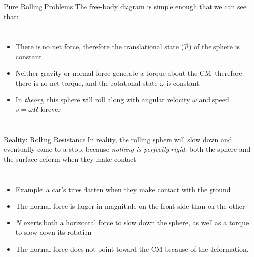 \documentclass[12pt,compress,aspectratio=169]{beamer}
\begin{document}
\begin{frame}{Pure Rolling Problems}
  The free-body diagram is simple enough that we can see that:
  \begin{columns}
    \begin{itemize}
    \item There is no net force, therefore the translational state ($\vec v$)
      of the sphere is constant

    \item Neither gravity or normal force generate a torque about the CM,
      therefore there is no net torque, and the rotational state $\omega$ is
      constant:

    \item In \emph{theory}, this sphere will roll along with angular velocity
      $\omega$ and speed $v=\omega R$ forever
    \end{itemize}

  \end{columns}
\end{frame}



\begin{frame}{Reality: Rolling Resistance}
  In reality, the rolling sphere will slow down and eventually come to a stop,
  because \emph{nothing is perfectly rigid}: both the sphere and the surface
  deform when they make contact
  \begin{columns}
    \begin{itemize}
    \item Example: a car's tires flatten when they make contact with the ground
    \item The normal force is larger in magnitude on the front side than on the
      other
    \item $N$ exerts both a horizontal force to slow down the sphere, as well
      as a torque to slow down its rotation
    \item The normal force does not point toward the CM because of the
      deformation.
    \end{itemize}

    \vspace{.3in}
  \end{columns}
\end{frame}
\end{document}
